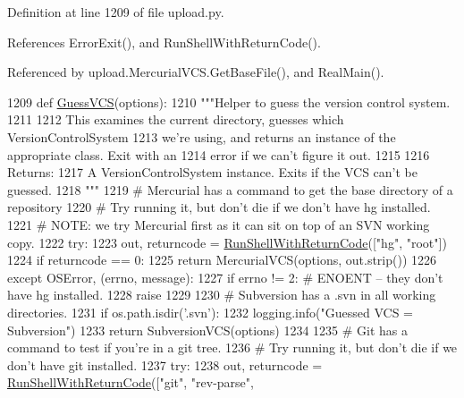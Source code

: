 Definition at line 1209 of file upload.\+py.



References Error\+Exit(), and Run\+Shell\+With\+Return\+Code().



Referenced by upload.\+Mercurial\+V\+C\+S.\+Get\+Base\+File(), and Real\+Main().


\begin{DoxyCode}
1209 \textcolor{keyword}{def }\hyperlink{namespaceupload_a31390568253accd22ee51861eaeb99bd}{GuessVCS}(options):
1210   \textcolor{stringliteral}{"""Helper to guess the version control system.}
1211 \textcolor{stringliteral}{}
1212 \textcolor{stringliteral}{  This examines the current directory, guesses which VersionControlSystem}
1213 \textcolor{stringliteral}{  we're using, and returns an instance of the appropriate class.  Exit with an}
1214 \textcolor{stringliteral}{  error if we can't figure it out.}
1215 \textcolor{stringliteral}{}
1216 \textcolor{stringliteral}{  Returns:}
1217 \textcolor{stringliteral}{    A VersionControlSystem instance. Exits if the VCS can't be guessed.}
1218 \textcolor{stringliteral}{  """}
1219   \textcolor{comment}{# Mercurial has a command to get the base directory of a repository}
1220   \textcolor{comment}{# Try running it, but don't die if we don't have hg installed.}
1221   \textcolor{comment}{# NOTE: we try Mercurial first as it can sit on top of an SVN working copy.}
1222   \textcolor{keywordflow}{try}:
1223     out, returncode = \hyperlink{namespaceupload_afa542d3a5a4f4fce174a1c23644a9204}{RunShellWithReturnCode}([\textcolor{stringliteral}{"hg"}, \textcolor{stringliteral}{"root"}])
1224     \textcolor{keywordflow}{if} returncode == 0:
1225       \textcolor{keywordflow}{return} MercurialVCS(options, out.strip())
1226   \textcolor{keywordflow}{except} OSError, (errno, message):
1227     \textcolor{keywordflow}{if} errno != 2:  \textcolor{comment}{# ENOENT -- they don't have hg installed.}
1228       \textcolor{keywordflow}{raise}
1229 
1230   \textcolor{comment}{# Subversion has a .svn in all working directories.}
1231   \textcolor{keywordflow}{if} os.path.isdir(\textcolor{stringliteral}{'.svn'}):
1232     logging.info(\textcolor{stringliteral}{"Guessed VCS = Subversion"})
1233     \textcolor{keywordflow}{return} SubversionVCS(options)
1234 
1235   \textcolor{comment}{# Git has a command to test if you're in a git tree.}
1236   \textcolor{comment}{# Try running it, but don't die if we don't have git installed.}
1237   \textcolor{keywordflow}{try}:
1238     out, returncode = \hyperlink{namespaceupload_afa542d3a5a4f4fce174a1c23644a9204}{RunShellWithReturnCode}([\textcolor{stringliteral}{"git"}, \textcolor{stringliteral}{"rev-parse"},

\end{DoxyCode}
